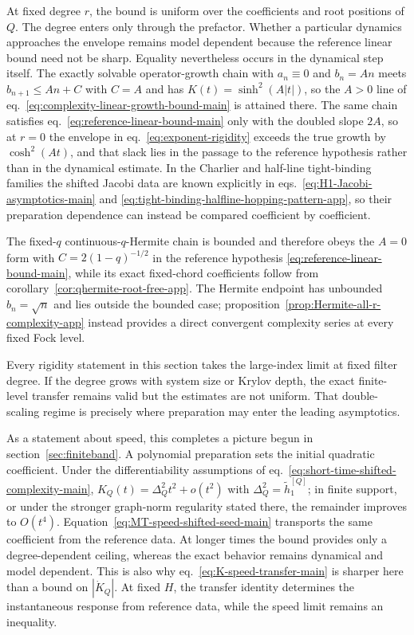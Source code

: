 \documentclass[a4paper,11pt]{article}
\theoremstyle{definition}
\theoremstyle{remark}
\newcommand{\thh}{\widetilde h}
\begin{document}
At fixed degree $r$, the bound is uniform over the coefficients and root positions of $Q$.
The degree enters only through the prefactor.  Whether a particular dynamics approaches the
envelope remains model dependent because the reference linear bound need not be sharp. Equality nevertheless occurs in the dynamical step itself. The exactly solvable operator-growth chain with $a_n\equiv0$ and $b_n=An$ \cite{Parker2019} meets $b_{n+1}\le An+C$ with $C=A$ and has $K(t)=\sinh^{2}(A|t|)$, so the $A>0$ line of eq.~\eqref{eq:complexity-linear-growth-bound-main} is attained there. The same chain satisfies eq.~\eqref{eq:reference-linear-bound-main} only with the doubled slope $2A$, so at $r=0$ the envelope in eq.~\eqref{eq:exponent-rigidity} exceeds the true growth by $\cosh^{2}(At)$, and that slack lies in the passage to the reference hypothesis rather than in the dynamical estimate.  In the
Charlier and half-line tight-binding families the shifted Jacobi data are known explicitly in
eqs.~\eqref{eq:H1-Jacobi-asymptotics-main} and
\eqref{eq:tight-binding-halfline-hopping-pattern-app}, so their preparation dependence can instead
be compared coefficient by coefficient. 

The fixed-$q$ continuous-$q$-Hermite chain is bounded and therefore obeys the $A=0$ form
with $C=2(1-q)^{-1/2}$ in the reference hypothesis
\eqref{eq:reference-linear-bound-main}, while its exact fixed-chord coefficients follow from
corollary~\ref{cor:qhermite-root-free-app}.  The Hermite endpoint has unbounded
$b_n=\sqrt n$ and lies outside the bounded case; proposition~\ref{prop:Hermite-all-r-complexity-app}
instead provides a direct convergent complexity series at every fixed Fock level.

Every rigidity statement in this section takes the
large-index limit at fixed filter degree.  If the degree grows with system size or Krylov depth,
the exact finite-level transfer remains valid but the estimates are not uniform.  That double-scaling regime is precisely where preparation may enter the leading asymptotics.

As a statement about speed, this completes a picture begun in
section~\ref{sec:finiteband}. 
A polynomial preparation sets the initial quadratic coefficient.  Under the differentiability
assumptions of eq.~\eqref{eq:short-time-shifted-complexity-main},
$K_Q(t)=\Delta_Q^2t^2+o(t^2)$ with $\Delta_Q^2=\thh_1^{[Q]}$; in finite support, or under the
stronger graph-norm regularity stated there, the remainder improves to $O(t^4)$.
Equation~\eqref{eq:MT-speed-shifted-seed-main} transports the same coefficient from the reference data.
At longer times the bound provides only a degree-dependent ceiling, whereas the exact
behavior remains dynamical and model dependent. This is also why
eq.~\eqref{eq:K-speed-transfer-main} is sharper here than a bound on $|\dot K_Q|$.  At fixed $H$,
the transfer identity determines the instantaneous response from reference data, while the speed
limit remains an inequality. 
\end{document}
